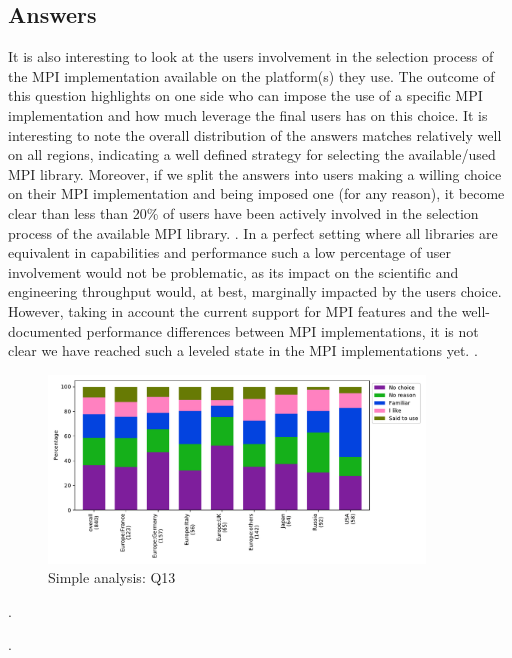 
\subsection{Answers}


It is also interesting to look at the users involvement in the selection process
of the MPI implementation available on the platform(s) they use. The outcome of
this question highlights on one side who can impose the use of a specific MPI
implementation and how much leverage the final users has on this choice. It is
interesting to note the overall distribution of the answers matches
relatively well on all regions, indicating a well defined strategy for selecting
the available/used MPI library. Moreover, if we split the answers into users
making a willing choice on their MPI implementation and being imposed one (for
any reason), it become clear than less than 20\% of users have been actively
involved in the selection process of the available MPI library.
.
%
In a perfect setting where all libraries are equivalent in capabilities and
performance such a low percentage of user involvement would not be problematic,
as its impact on the scientific and engineering throughput would, at best,
marginally impacted by the users choice. However, taking in account the current
support for MPI features and the well-documented performance differences between
MPI implementations, it is not clear we have reached such a leveled state in the
MPI implementations yet.
.
\begin{figure}[htb]
\begin{center}
\includegraphics[width=10cm]{../pdfs/Q13.pdf}
\caption{Simple analysis: Q13}
\label{fig:Q13}
\end{center}
\end{figure}

.

.
